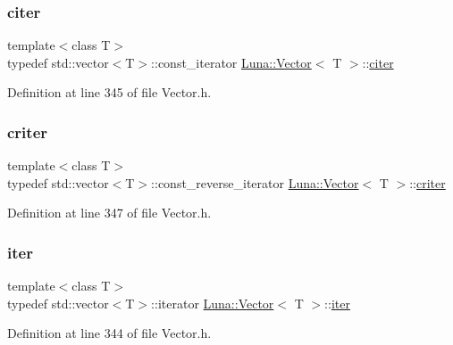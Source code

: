 \subsubsection{\texorpdfstring{citer}{citer}}
{\footnotesize\ttfamily template$<$class T$>$ \\
typedef std\+::vector$<$T$>$\+::const\+\_\+iterator \hyperlink{classLuna_1_1Vector}{Luna\+::\+Vector}$<$ T $>$\+::\hyperlink{classLuna_1_1Vector_a90cff5eab2782bc1c6aaa879ce18a2b8}{citer}}



Definition at line 345 of file Vector.\+h.

\mbox{\label{classLuna_1_1Vector_a66e997f05169640055703449672be075}} 
\subsubsection{\texorpdfstring{criter}{criter}}
{\footnotesize\ttfamily template$<$class T$>$ \\
typedef std\+::vector$<$T$>$\+::const\+\_\+reverse\+\_\+iterator \hyperlink{classLuna_1_1Vector}{Luna\+::\+Vector}$<$ T $>$\+::\hyperlink{classLuna_1_1Vector_a66e997f05169640055703449672be075}{criter}}



Definition at line 347 of file Vector.\+h.

\mbox{\label{classLuna_1_1Vector_aa6c4164f0cd114da31acfde53a36d65e}} 
\subsubsection{\texorpdfstring{iter}{iter}}
{\footnotesize\ttfamily template$<$class T$>$ \\
typedef std\+::vector$<$T$>$\+::iterator \hyperlink{classLuna_1_1Vector}{Luna\+::\+Vector}$<$ T $>$\+::\hyperlink{classLuna_1_1Vector_aa6c4164f0cd114da31acfde53a36d65e}{iter}}



Definition at line 344 of file Vector.\+h.

\mbox{\label{classLuna_1_1Vector_a6db6c6b09df2c68bbfd1960c56bb20d5}} 
